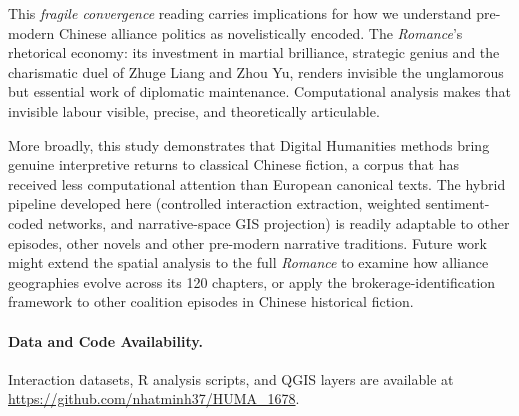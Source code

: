 \documentclass[12pt, a4paper]{article}
\newcommand{\booktitle}[1]{\textit{#1}}
\begin{document}
This \emph{fragile convergence} reading carries implications for how we
understand pre-modern Chinese alliance politics as novelistically encoded.
The \booktitle{Romance}'s rhetorical economy: its investment in martial
brilliance, strategic genius and the charismatic duel of Zhuge Liang
and Zhou Yu, renders invisible the unglamorous but essential work of
diplomatic maintenance.
Computational analysis makes that invisible labour visible, precise,
and theoretically articulable.

More broadly, this study demonstrates that Digital Humanities methods
bring genuine interpretive returns to classical Chinese fiction, a corpus
that has received less computational attention than European canonical
texts.
The hybrid pipeline developed here (controlled interaction extraction,
weighted sentiment-coded networks, and narrative-space GIS projection) is readily adaptable to other episodes, other novels and other
pre-modern narrative traditions.
Future work might extend the spatial analysis to the full \booktitle{Romance}
to examine how alliance geographies evolve across its 120 chapters, or
apply the brokerage-identification framework to other coalition episodes
in Chinese historical fiction.

\paragraph{Data and Code Availability.}
Interaction datasets, R analysis scripts, and QGIS layers are available at
\url{https://github.com/nhatminh37/HUMA_1678}.


\newpage
\printbibliography[title={References}]
\end{document}
